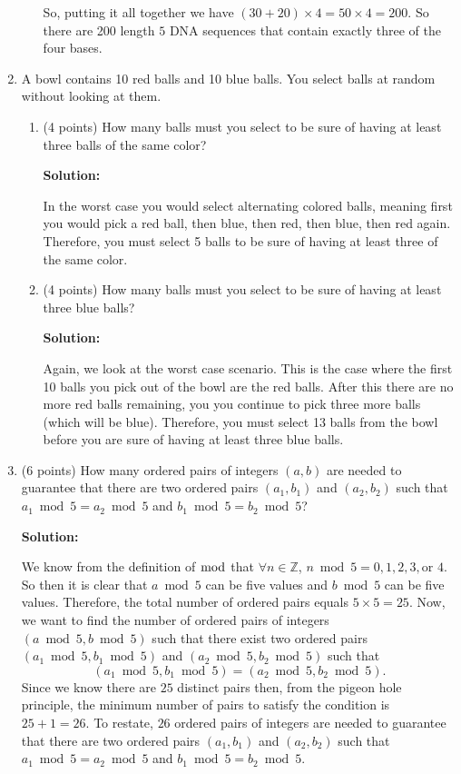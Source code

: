 \documentclass[11pt]{article}
\begin{document}
\begin{enumerate}
\begin{enumerate}
So, putting it all together we have $(30 + 20) \times 4 = 50 \times 4 = 200$.  So there are 200 length $5$ DNA sequences that contain exactly three of the four bases.  

\end{enumerate}

\item A bowl contains 10 red balls and 10 blue balls.
You select balls at random without looking at them.
\begin{enumerate}
\item (4 points) How many balls must you select to be sure of having at least three balls of the same color?

\textbf{Solution: }

In the worst case you would select alternating colored balls, meaning first you would pick a red ball, then blue, then red, then blue, then red again.  Therefore, you must select 5 balls to be sure of having at least three of the same color.  

\item (4 points) How many balls must you select to be sure of having at least three blue balls?

\textbf{Solution: }

Again, we look at the worst case scenario.  This is the case where the first 10 balls you pick out of the bowl are the red balls.  After this there are no more red balls remaining, you you continue to pick three more balls (which will be blue).  Therefore, you must select 13 balls from the bowl before you are sure of having at least three blue balls.  

\end{enumerate}


\item (6 points) How many ordered pairs of integers $(a,b)$ are needed to guarantee that
there are two ordered pairs $(a_1,b_1)$ and $(a_2,b_2)$ such that $a_1\bmod 5=a_2\bmod 5$ and
$b_1\bmod 5=b_2\bmod 5$?

\textbf{Solution: }

We know from the definition of $\bmod$ that $\forall n \in \mathbb{Z}$, $n\bmod5 = 0,1,2,3, \text{or }4$.  
So then it is clear that $a\bmod5$ can be five values and $b\bmod5$ can be five values.  Therefore, the total number of ordered pairs equals $5 \times 5 = 25$.  Now, we want to find the number of ordered pairs of integers $(a\bmod5,b\bmod5)$ such that there exist two ordered pairs $(a_1\bmod5,b_1\bmod5)$ and $(a_2\bmod5,b_2\bmod5)$ such that 
$$ (a_1\bmod5,b_1\bmod5) = (a_2\bmod5,b_2\bmod5). $$
Since we know there are $25$ distinct pairs then, from the pigeon hole principle, the minimum number of pairs to satisfy the condition is $25 + 1 = 26$.  To restate, $26$ ordered pairs of integers are needed to guarantee that there are two ordered pairs $(a_1,b_1)$ and $(a_2,b_2)$ such that $a_1\bmod 5=a_2\bmod 5$ and $b_1\bmod 5=b_2\bmod 5$.  


\end{enumerate}
\end{document}
